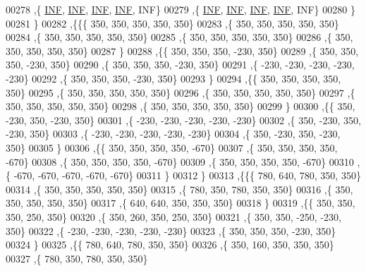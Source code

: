 \begin{DoxyCode}
00278    ,\{   \hyperlink{energy__const_8h_a12c2040f25d8e3a7b9e1c2024c618cb6}{INF},   \hyperlink{energy__const_8h_a12c2040f25d8e3a7b9e1c2024c618cb6}{INF},   \hyperlink{energy__const_8h_a12c2040f25d8e3a7b9e1c2024c618cb6}{INF},   \hyperlink{energy__const_8h_a12c2040f25d8e3a7b9e1c2024c618cb6}{INF},   INF\}
00279    ,\{   \hyperlink{energy__const_8h_a12c2040f25d8e3a7b9e1c2024c618cb6}{INF},   \hyperlink{energy__const_8h_a12c2040f25d8e3a7b9e1c2024c618cb6}{INF},   \hyperlink{energy__const_8h_a12c2040f25d8e3a7b9e1c2024c618cb6}{INF},   \hyperlink{energy__const_8h_a12c2040f25d8e3a7b9e1c2024c618cb6}{INF},   INF\}
00280    \}
00281   \}
00282  ,\{\{\{   350,   350,   350,   350,   350\}
00283    ,\{   350,   350,   350,   350,   350\}
00284    ,\{   350,   350,   350,   350,   350\}
00285    ,\{   350,   350,   350,   350,   350\}
00286    ,\{   350,   350,   350,   350,   350\}
00287    \}
00288   ,\{\{   350,   350,   350,  -230,   350\}
00289    ,\{   350,   350,   350,  -230,   350\}
00290    ,\{   350,   350,   350,  -230,   350\}
00291    ,\{  -230,  -230,  -230,  -230,  -230\}
00292    ,\{   350,   350,   350,  -230,   350\}
00293    \}
00294   ,\{\{   350,   350,   350,   350,   350\}
00295    ,\{   350,   350,   350,   350,   350\}
00296    ,\{   350,   350,   350,   350,   350\}
00297    ,\{   350,   350,   350,   350,   350\}
00298    ,\{   350,   350,   350,   350,   350\}
00299    \}
00300   ,\{\{   350,  -230,   350,  -230,   350\}
00301    ,\{  -230,  -230,  -230,  -230,  -230\}
00302    ,\{   350,  -230,   350,  -230,   350\}
00303    ,\{  -230,  -230,  -230,  -230,  -230\}
00304    ,\{   350,  -230,   350,  -230,   350\}
00305    \}
00306   ,\{\{   350,   350,   350,   350,  -670\}
00307    ,\{   350,   350,   350,   350,  -670\}
00308    ,\{   350,   350,   350,   350,  -670\}
00309    ,\{   350,   350,   350,   350,  -670\}
00310    ,\{  -670,  -670,  -670,  -670,  -670\}
00311    \}
00312   \}
00313  ,\{\{\{   780,   640,   780,   350,   350\}
00314    ,\{   350,   350,   350,   350,   350\}
00315    ,\{   780,   350,   780,   350,   350\}
00316    ,\{   350,   350,   350,   350,   350\}
00317    ,\{   640,   640,   350,   350,   350\}
00318    \}
00319   ,\{\{   350,   350,   350,   250,   350\}
00320    ,\{   350,   260,   350,   250,   350\}
00321    ,\{   350,   350,  -250,  -230,   350\}
00322    ,\{  -230,  -230,  -230,  -230,  -230\}
00323    ,\{   350,   350,   350,  -230,   350\}
00324    \}
00325   ,\{\{   780,   640,   780,   350,   350\}
00326    ,\{   350,   160,   350,   350,   350\}
00327    ,\{   780,   350,   780,   350,   350\}

\end{DoxyCode}

